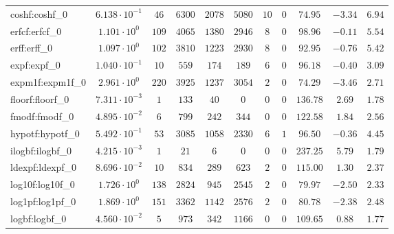 \begin{tabular}{|l|c|c|c|c|c|c|c|c|c|c|}
coshf:coshf\_0               & $ 6.138 \cdot 10^{-1} $ & $ 46     $ & $ 6300   $ & $ 2078  $ & $ 5080  $ & $ 10  $ & $ 0 $ & $ 74.95       $ & $ -3.34   $ & $ 6.94    $ \\
erfcf:erfcf\_0               & $ 1.101 \cdot 10^{0}  $ & $ 109    $ & $ 4065   $ & $ 1380  $ & $ 2946  $ & $ 8   $ & $ 0 $ & $ 98.96       $ & $ -0.11   $ & $ 5.54    $ \\
erff:erff\_0                 & $ 1.097 \cdot 10^{0}  $ & $ 102    $ & $ 3810   $ & $ 1223  $ & $ 2930  $ & $ 8   $ & $ 0 $ & $ 92.95       $ & $ -0.76   $ & $ 5.42    $ \\
expf:expf\_0                 & $ 1.040 \cdot 10^{-1} $ & $ 10     $ & $ 559    $ & $ 174   $ & $ 189   $ & $ 6   $ & $ 0 $ & $ 96.18       $ & $ -0.40   $ & $ 3.09    $ \\
expm1f:expm1f\_0             & $ 2.961 \cdot 10^{0}  $ & $ 220    $ & $ 3925   $ & $ 1237  $ & $ 3054  $ & $ 2   $ & $ 0 $ & $ 74.29       $ & $ -3.46   $ & $ 2.71    $ \\
floorf:floorf\_0             & $ 7.311 \cdot 10^{-3} $ & $ 1      $ & $ 133    $ & $ 40    $ & $ 0     $ & $ 0   $ & $ 0 $ & $ 136.78      $ & $ 2.69    $ & $ 1.78    $ \\
fmodf:fmodf\_0               & $ 4.895 \cdot 10^{-2} $ & $ 6      $ & $ 799    $ & $ 242   $ & $ 344   $ & $ 0   $ & $ 0 $ & $ 122.58      $ & $ 1.84    $ & $ 2.56    $ \\
hypotf:hypotf\_0             & $ 5.492 \cdot 10^{-1} $ & $ 53     $ & $ 3085   $ & $ 1058  $ & $ 2330  $ & $ 6   $ & $ 1 $ & $ 96.50       $ & $ -0.36   $ & $ 4.45    $ \\
ilogbf:ilogbf\_0             & $ 4.215 \cdot 10^{-3} $ & $ 1      $ & $ 21     $ & $ 6     $ & $ 0     $ & $ 0   $ & $ 0 $ & $ 237.25      $ & $ 5.79    $ & $ 1.79    $ \\
ldexpf:ldexpf\_0             & $ 8.696 \cdot 10^{-2} $ & $ 10     $ & $ 834    $ & $ 289   $ & $ 623   $ & $ 2   $ & $ 0 $ & $ 115.00      $ & $ 1.30    $ & $ 2.37    $ \\
log10f:log10f\_0             & $ 1.726 \cdot 10^{0}  $ & $ 138    $ & $ 2824   $ & $ 945   $ & $ 2545  $ & $ 2   $ & $ 0 $ & $ 79.97       $ & $ -2.50   $ & $ 2.33    $ \\
log1pf:log1pf\_0             & $ 1.869 \cdot 10^{0}  $ & $ 151    $ & $ 3362   $ & $ 1142  $ & $ 2576  $ & $ 2   $ & $ 0 $ & $ 80.78       $ & $ -2.38   $ & $ 2.48    $ \\
logbf:logbf\_0               & $ 4.560 \cdot 10^{-2} $ & $ 5      $ & $ 973    $ & $ 342   $ & $ 1166  $ & $ 0   $ & $ 0 $ & $ 109.65      $ & $ 0.88    $ & $ 1.77    $ \\

\end{tabular}
